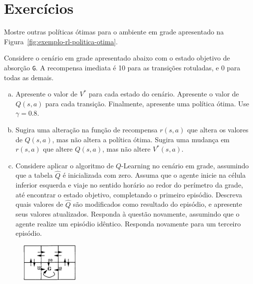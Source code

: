 \clearpage

\section{Exercícios}

\resetexercisenumbering

\begin{exercise}
Mostre outras políticas ótimas para o ambiente em grade apresentado na Figura~\ref{fig:exemplo-rl-politica-otima}.
\end{exercise}

\begin{exercise}
Considere o cenário em grade apresentado abaixo com o estado objetivo de absorção \texttt{G}. A recompensa imediata é 10 para as transições rotuladas, e 0 para todas as demais.
\begin{enumerate}[a.]
	\item Apresente o valor de $V^*$ para cada estado do cenário. Apresente o valor de $Q(s, a)$ para cada transição. Finalmente, apresente uma política ótima. Use $\gamma = 0.8$.
	
	\item Sugira uma alteração na função de recompensa $r(s, a)$ que altera os valores de $Q(s, a)$, mas não altera a política ótima. Sugira uma mudança em $r(s, a)$ que altere $Q(s, a)$, mas não altere $V^*(s, a)$.
	
	\item Considere aplicar o algoritmo de $Q$-Learning no cenário em grade, assumindo que a tabela $\widehat{Q}$ é inicializada com zero. Assuma que o agente inicie na célula inferior esquerda e viaje no sentido horário ao redor do perímetro da grade, até encontrar o estado objetivo, completando o primeiro episódio. Descreva quais valores de $\widehat{Q}$ são modificados como resultado do episódio, e apresente seus valores atualizados. Responda à questão novamente, assumindo que o agente realize um episódio idêntico. Responda novamente para um terceiro episódio.
\end{enumerate}

\begin{figure}[h]
	\centering
	\includegraphics[width=0.25\textwidth]{img/exercicios/grade-rl}
\end{figure}
\end{exercise}

